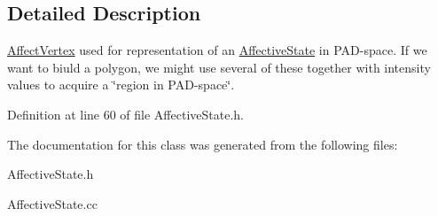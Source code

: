 \subsection{\-Detailed \-Description}
\hyperlink{class_affect_vertex}{\-Affect\-Vertex} used for representation of an \hyperlink{class_affective_state}{\-Affective\-State} in \-P\-A\-D-\/space. \-If we want to biuld a polygon, we might use several of these together with intensity values to acquire a \char`\"{}region in P\-A\-D-\/space\char`\"{}. 

\-Definition at line 60 of file \-Affective\-State.\-h.



\-The documentation for this class was generated from the following files\-:\begin{DoxyCompactItemize}
\item 
\-Affective\-State.\-h\item 
\-Affective\-State.\-cc\end{DoxyCompactItemize}
